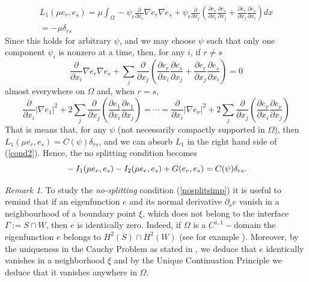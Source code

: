 \documentclass[a4paper,reqno,11pt,oneside]{amsart}
\theoremstyle{plain}
\theoremstyle{plain}
\theoremstyle{plain}
\theoremstyle{remark}
\newtheorem{rem}[thm]{Remark}
\begin{document}
\begin{multline*}
    L_1( \mu e_r,e_s)=
  \mu \int_\Omega-\psi_i \frac{\partial}{\partial x_i} \nabla e_r\nabla e_s + \psi_i\frac{\partial }{ \partial x_j}\left(\frac{\partial e_r}{\partial x_i}\frac{\partial e_s}{\partial x_j}+
\frac{\partial e_r}{\partial x_j}\frac{\partial e_s}{\partial x_i}
\right) dx
\\=-\mu \delta_{rs}
\end{multline*}
Since this holds for arbitrary $\psi$, and  we may choose $\psi$ such that only one component $\psi_i$  is nonzero  at a time, then, for any $i$,  if $r\neq s$
\begin{equation*}
    \frac{\partial}{\partial x_i} \nabla e_r\nabla e_s +\sum_j\frac{\partial }{ \partial x_j}\left(\frac{\partial e_r}{\partial x_i}\frac{\partial e_s}{\partial x_j}+
\frac{\partial e_r}{\partial x_j}\frac{\partial e_s}{\partial x_i}
\right)=0
\end{equation*}
 almost everywhere on $\Omega$ and, when $r=s$, 
 \begin{equation*}
     \frac{\partial}{\partial x_i} |\nabla e_1|^2 +2\sum_j\frac{\partial }{ \partial x_j}\left(\frac{\partial e_1}{\partial x_i}\frac{\partial e_1}{\partial x_j}
\right)=\cdots=
\frac{\partial}{\partial x_i} |\nabla e_\nu|^2 +2\sum_j\frac{\partial }{ \partial x_j}\left(\frac{\partial e_\nu}{\partial x_i}\frac{\partial e_\nu}{\partial x_j}
\right)
 \end{equation*}
 That is means that, for any $\psi$ (not necessarily compactly supported in $\Omega$),  then $L_1(\mu e_r,e_s)=C(\psi)\delta_{rs}$, and we can absorb $L_1$  in the right hand side of (\ref{cond2}). Hence, the no splitting condition becomes
 \begin{equation}{\label{nosplitsimp}}
    -I_1( \mu e_r,e_s)
-I_2( \mu e_r, e_s)+G(e_r,e_s)=C(\psi)\delta_{rs}.
\end{equation}

\begin{rem}\label{uniquecont} To  study  the {\em no-splitting} condition (\ref{nosplitsimp}) it is useful to remind that
 if an eigenfunction $e$ and its normal derivative $\partial_\nu e$ vanish in a neighbourhood of a boundary point $\xi$, which does not belong to the interface $\Gamma:=S\cap W$, then  $e$ is identically zero.
 Indeed,
if   $\Omega$ is a  $C^{1,1}-$domain the eigenfunction $e$ belongs to  $H^2(S)\cap H^2(W)$ (see for example \cite[Theorem 2.4.2.7]{grisvard}). 
Moreover, by the   uniqueness in the Cauchy Problem as stated in \cite[p. 83]{henry}, we deduce that $e$ identically vanishes in a neighborhood
 $\xi$ and  by the Unique Continuation Principle we deduce that it vanishes anywhere in $\Omega$.

\end{rem}
\end{document}
